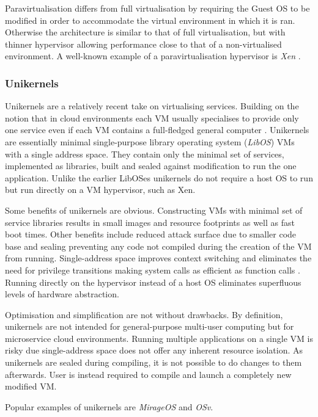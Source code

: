 Paravirtualisation differs from full virtualisation by requiring the Guest OS to be modified in order to accommodate the virtual environment in which it is ran. Otherwise the architecture is similar to that of full virtualisation, but with thinner hypervisor allowing performance close to that of a non-virtualised environment. A well-known example of a paravirtualisation hypervisor is \textit{Xen} \cite{xen}.

\subsubsection{Unikernels}

Unikernels are a relatively recent take on virtualising services. Building on the notion that in cloud environments each VM usually specialises to provide only one service even if each VM contains a full-fledged general computer \cite{unikernels}. Unikernels are essentially minimal single-purpose library operating system (\textit{LibOS})\cite{libos} VMs with a single address space. They contain only the minimal set of services, implemented as libraries, built and sealed against modification to run the one application. Unlike the earlier LibOSes unikernels do not require a host OS to run but run directly on a VM hypervisor, such as Xen.

Some benefits of unikernels are obvious. Constructing VMs with minimal set of service libraries results in small images and resource footprints as well as fast boot times. Other benefits include reduced attack surface due to smaller code base and sealing preventing any code not compiled during the creation of the VM from running. Single-address space improves context switching and eliminates the need for privilege transitions making system calls as efficient as function calls \cite{osv}. Running directly on the hypervisor instead of a host OS eliminates superfluous levels of hardware abstraction.

Optimisation and simplification are not without drawbacks. By definition, unikernels are not intended for general-purpose multi-user computing but for microservice cloud environments. Running multiple applications on a single VM is risky due single-address space does not offer any inherent resource isolation. As unikernels are sealed during compiling, it is not possible to do changes to them afterwards. User is instead required to compile and launch a completely new modified VM.

Popular examples of unikernels are \textit{MirageOS}\cite{mirage} and \textit{OSv}\cite{osv}.

